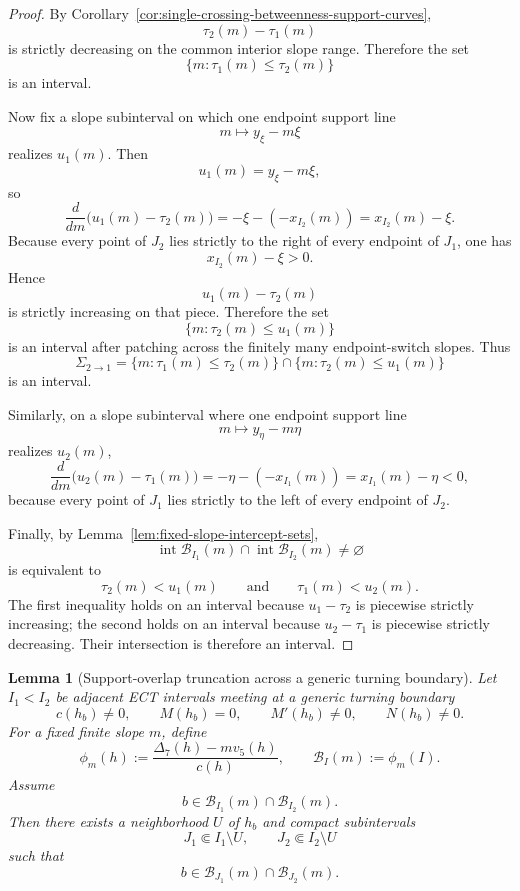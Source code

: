 \documentclass[11pt,a4paper]{amsart}
\theoremstyle{plain}
\newtheorem{lemma}[theorem]{Lemma}
\theoremstyle{definition}
\begin{document}
\begin{proof}
By Corollary~\ref{cor:single-crossing-betweenness-support-curves},
\[
\tau_2(m)-\tau_1(m)
\]
is strictly decreasing on the common interior slope range. Therefore the set
\[
\{m:\tau_1(m)\le \tau_2(m)\}
\]
is an interval.

Now fix a slope subinterval on which one endpoint support line
\[
m\mapsto y_\xi-m\xi
\]
realizes $u_1(m)$. Then
\[
u_1(m)=y_\xi-m\xi,
\]
so
\[
\frac{d}{dm}\bigl(u_1(m)-\tau_2(m)\bigr)
=
-\xi-(-x_{I_2}(m))
=
x_{I_2}(m)-\xi.
\]
Because every point of $J_2$ lies strictly to the right of every endpoint of
$J_1$, one has
\[
x_{I_2}(m)-\xi>0.
\]
Hence
\[
u_1(m)-\tau_2(m)
\]
is strictly increasing on that piece. Therefore the set
\[
\{m:\tau_2(m)\le u_1(m)\}
\]
is an interval after patching across the finitely many endpoint-switch slopes.
Thus
\[
\Sigma_{2\to 1}
=
\{m:\tau_1(m)\le \tau_2(m)\}\cap \{m:\tau_2(m)\le u_1(m)\}
\]
is an interval.

Similarly, on a slope subinterval where one endpoint support line
\[
m\mapsto y_\eta-m\eta
\]
realizes $u_2(m)$,
\[
\frac{d}{dm}\bigl(u_2(m)-\tau_1(m)\bigr)
=
-\eta-(-x_{I_1}(m))
=
x_{I_1}(m)-\eta<0,
\]
because every point of $J_1$ lies strictly to the left of every endpoint of
$J_2$.

Finally, by Lemma~\ref{lem:fixed-slope-intercept-sets},
\[
\operatorname{int}\mathcal B_{I_1}(m)\cap
\operatorname{int}\mathcal B_{I_2}(m)\neq\varnothing
\]
is equivalent to
\[
\tau_2(m)<u_1(m)
\qquad\text{and}\qquad
\tau_1(m)<u_2(m).
\]
The first inequality holds on an interval because $u_1-\tau_2$ is piecewise
strictly increasing; the second holds on an interval because $u_2-\tau_1$ is
piecewise strictly decreasing. Their intersection is therefore an interval.
\end{proof}

\begin{lemma}[Support-overlap truncation across a generic turning boundary]
\label{lem:support-overlap-truncation-turning}
Let $I_1<I_2$ be adjacent ECT intervals meeting at a generic turning boundary
\[
c(h_b)\neq 0,
\qquad
M(h_b)=0,
\qquad
M'(h_b)\neq 0,
\qquad
N(h_b)\neq 0.
\]
For a fixed finite slope $m$, define
\[
\phi_m(h):=\frac{\Delta_7(h)-m v_5(h)}{c(h)},
\qquad
\mathcal B_I(m):=\phi_m(I).
\]
Assume
\[
b\in \mathcal B_{I_1}(m)\cap \mathcal B_{I_2}(m).
\]
Then there exists a neighborhood $U$ of $h_b$ and compact subintervals
\[
J_1\Subset I_1\setminus U,
\qquad
J_2\Subset I_2\setminus U
\]
such that
\[
b\in \mathcal B_{J_1}(m)\cap \mathcal B_{J_2}(m).
\]
\end{lemma}
\end{document}

